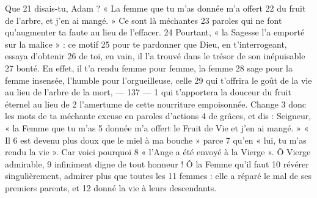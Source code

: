 Que	 
21	 	disais-tu, Adam ? « La femme que tu m'as donnée m'a offert	 
22	 	du fruit de l'arbre, et j'en ai mangé. » Ce sont là méchantes	 
23	 	paroles qui ne font qu'augmenter ta faute au lieu de l'effacer.	 
24	 	Pourtant, « la Sagesse l'a emporté sur la malice » : ce motif	 
25	 	pour te pardonner que Dieu, en t'interrogeant, essaya d'obtenir	 
26	 	de toi, en vain, il l'a trouvé dans le trésor de son inépuisable	 
27	 	bonté. En effet, il t'a rendu femme pour femme, la femme	 
28	 	sage pour la femme insensée, l'humble pour l'orgueilleuse, celle	 
29	 	qui t'offrira le goût de la vie au lieu de l'arbre de la mort,	 
 	--- 137 ---	 
1	 	qui t'apportera la douceur du fruit éternel au lieu de	 
2	 	l'amertume de cette nourriture empoisonnée. Change	 
3	 	donc les mots de ta méchante excuse en paroles d'actions	 
4	 	de grâces, et dis : Seigneur, « la Femme que tu m'as	 
5	 	donnée m'a offert le Fruit de Vie et j'en ai mangé. » « Il	 
6	 	est devenu plus doux que le miel à ma bouche » parce	 
7	 	qu'en « lui, tu m'as rendu la vie ». Car voici pourquoi	 
8	 	« l'Ange a été envoyé à la Vierge ». Ô Vierge admirable,	 
9	 	infiniment digne de tout honneur ! Ô la Femme qu'il faut	 
10	 	révérer singulièrement, admirer plus que toutes les	 
11	 	femmes : elle a réparé le mal de ses premiers parents, et	 
12	 	donné la vie à leurs descendants.